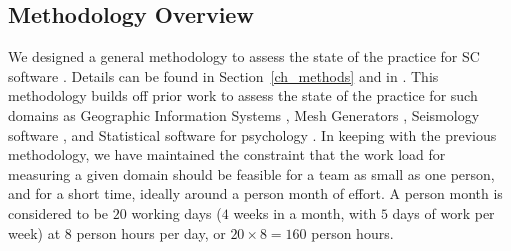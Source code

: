 \documentclass[3p, 12pt,authoryear]{elsarticle}
\begin{document}

\subsection{Methodology Overview}

We designed a general methodology to assess the state of the practice for SC
software \citep{SmithEtAl2021}. Details can be found in Section~\ref{ch_methods}
and in \citep{Dong2021}.  This methodology builds off prior work to assess the
state of the practice for such domains as Geographic Information Systems
\citep{smith2018state}, Mesh Generators \citep{smith2016state}, Seismology
software \citep{Smith2018Seismology}, and Statistical software for psychology
\citep{smith2018statistical}.  In keeping with the previous methodology, we have
maintained the constraint that the work load for measuring a given domain should
be feasible for a team as small as one person, and for a short time, ideally
around a person month of effort. A person month is considered to be $20$ working
days ($4$ weeks in a month, with $5$ days of work per week) at $8$ person hours
per day, or $20 \times 8 = 160$ person hours.
\end{document}
